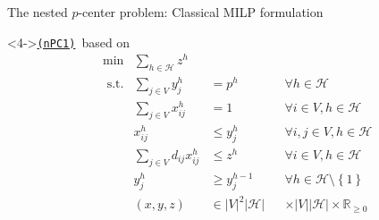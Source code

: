 \documentclass[utf8,aspectratio=1610,ngerman,english]{beamer}
\newcommand{\nPC}{\hyperref[eq:nPC]{\texttt{(nPC1)}}\xspace}
\newcommand{\inH}{h \in \mathcal H}
\begin{document}
\begin{frame}{The nested $p$-center problem: Classical MILP formulation}
\begin{minipage}[t]{0.48\textwidth}
\begin{block}
        \end{block}
    \end{minipage}
    \begin{minipage}[t]{0.48\textwidth}
        \begin{block}<4->{\nPC\ based on \cite{wiley2013}}
            \vspace*{-12pt}
            \begin{subequations}
                \begin{alignat}{3}
                     & \min         & \sum_{\inH}z^{h}             &                                                                              \\
                     & \text{ s.t.} & \sum_{j \in V}y_{j}^h        & =     p^{h}           &  & \forall \inH                                      \\
                     &              & \sum_{j \in V}x_{ij}^h       & =     1               &  & \forall i \in V, \inH                             \\
                     &              & x_{ij}^h                     & \leq  y_j^{h}         &  & \forall i,j \in V, \inH                           \\
                     &              & \sum_{j \in V}d_{ij}x_{ij}^h & \leq  z^{h}           &  & \forall i \in V, \inH                             \\
                     &              & y_{j}^h                      & \geq  y_j^{h-1}       &  & \forall \inH \setminus \left \{1 \right \}        \\
                     &              & (x,y,z)                      & \in |V|^2|\mathcal H| &  & \times |V||\mathcal H| \times \mathbb{R}_{\geq 0}
                \end{alignat}  \label{eq:nPC}
            \end{subequations}
        \end{block}
    \end{minipage}
\end{frame}
\end{document}
